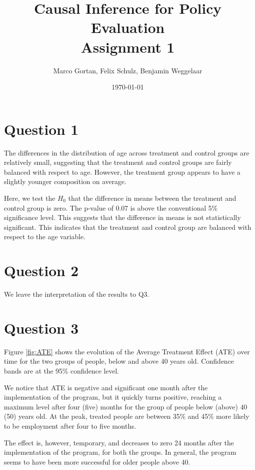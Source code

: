 \documentclass{scrartcl}
\title{Causal Inference for Policy Evaluation\\
\Large{Assignment 1}}
\author{Marco Gortan, Felix Schulz, Benjamin Weggelaar}
\date{\today}
\begin{document}
\maketitle


\section*{Question 1}



The differences in the distribution of age across treatment and control groups are relatively small, suggesting that the treatment and control groups are fairly balanced with respect to age. However, the treatment group appears to have a slightly younger composition on average.



Here, we test the $H_0$ that the difference in means between the treatment and control group is zero. The p-value of 0.07 is above the conventional 5\% significance level. This suggests that the difference in means is not statistically significant. This indicates that the treatment and control group are balanced with respect to the age variable.

\section*{Question 2}

We leave the interpretation of the results to Q3.


\section*{Question 3}

Figure \ref{fig:ATE} shows the evolution of the Average Treatment Effect (ATE) over time for the two groups of people, below and above 40 years old. Confidence bands are at the 95\% confidence level. 

We notice that ATE is negative and significant one month after the implementation of the program, but it quickly turns positive, reaching a maximum level after four (five) months for the group of people below (above) 40 (50) years old. At the peak, treated people are between 35\% and 45\% more likely to be employment after four to five months. 

The effect is, however, temporary, and decreases to zero 24 months after the implementation of the program, for both the groups. In general, the program seems to have been more successful for older people above 40.  
\end{document}
